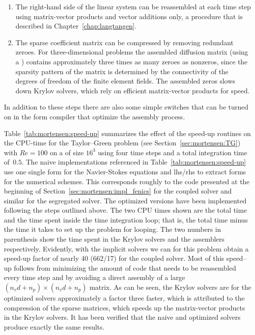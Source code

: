 \begin{enumerate}
\item The right-hand side of the linear system can be reassembled
  at each time step using matrix-vector products and vector additions
  only, a procedure that is described in Chapter~\ref{chap:langtangen}.

\item The sparse coefficient matrix can be compressed by removing
  redundant zeroes. For three-dimensional problems the assembled diffusion
  matrix (using a ) contains approximately three
  times as many zeroes as nonzeros, since the sparsity pattern of the
  matrix is determined by the connectivity of the degrees of freedom
  of the finite element fields. The assembled zeros slows down Krylov
  solvers, which rely on efficient matrix-vector products for speed.


\end{enumerate}
In addition to these steps there are also some simple switches that can
be turned on in the form compiler that optimize the assembly process.

Table~\ref{tab:mortensen:speed-up} summarizes the effect of the
speed-up routines on the CPU-time for the Taylor--Green problem (see
Section~\ref{sec:mortensen:TG}) with $Re=100$ on a  of size
$16^3$ using four time steps and a total integration time of~$0.5$.
The naive implementations referenced in Table~\ref{tab:mortensen:speed-up}
use one single form for the Navier-Stokes equations and lhs/rhs to extract
forms for the numerical schemes. This corresponds roughly to the code
presented at the beginning of
Section~\ref{sec:mortensen:impl_fenics} for the coupled solver and similar
for the segregated solver. The optimized versions have been implemented
following the steps outlined above. The two CPU times shown are the total
time and the time spent inside the time integration loop; that is, the
total time minus the time it takes to set up the problem for looping. The
two numbers in parenthesis show the time spent in the Krylov solvers
and the assemblers respectively. Evidently, with the implicit solvers
we can for this problem obtain a speed-up factor of nearly 40 (662/17)
for the coupled solver. Most of this speed--up follows from minimizing
the amount of code that needs to be reassembled every time step and by
avoiding a direct assembly of a large $(n_vd+n_p)\times (n_vd+n_p)$
matrix. As can be seen, the Krylov solvers are for the optimized
solvers approximately a factor three faster, which is attributed to the
compression of the sparse matrices, which speeds up the matrix-vector
products in the Krylov solvers. It has been verified that the naive and
optimized solvers produce exactly the same results.

